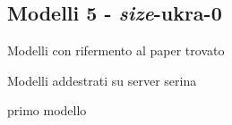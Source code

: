 \subsection*{Modelli 5 - \textit{size}-ukra-0}


Modelli con rifermento al paper trovato

Modelli addestrati su server serina




primo modello